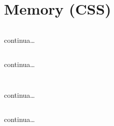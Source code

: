 \section[Memory]{Memory (CSS)}


\begin{frame}[fragile]\transfade
  \begin{sol}\centering
    \inputminted[lastline=17]{html}{memory/css/memory.html}
    continua\dots
  \end{sol}
\end{frame}
\begin{frame}[fragile]\transfade
  \begin{sol}\centering
    \inputminted[firstline=18, lastline=44, fontsize=\tiny]{html}{memory/css/memory.html}
    continua\dots
  \end{sol}
\end{frame}
\begin{frame}[fragile]\transfade
  \begin{sol}\centering
    \inputminted[firstline=47, breaklines]{html}{memory/css/memory.html}
  \end{sol}
\end{frame}


\begin{frame}[fragile]\transfade
  \begin{sol}\centering
    \inputminted[breaklines, lastline=21]{css}{memory/css/memory.css}
    continua\dots
  \end{sol}
\end{frame}
\begin{frame}[fragile]\transfade
  \begin{sol}\centering
    \inputminted[breaklines, firstline=23, lastline=44]{css}{memory/css/memory.css}
    continua\dots
  \end{sol}
\end{frame}
\begin{frame}[fragile]\transfade
  \begin{sol}\centering
    \inputminted[breaklines, firstline=46]{css}{memory/css/memory.css}
  \end{sol}
\end{frame}
